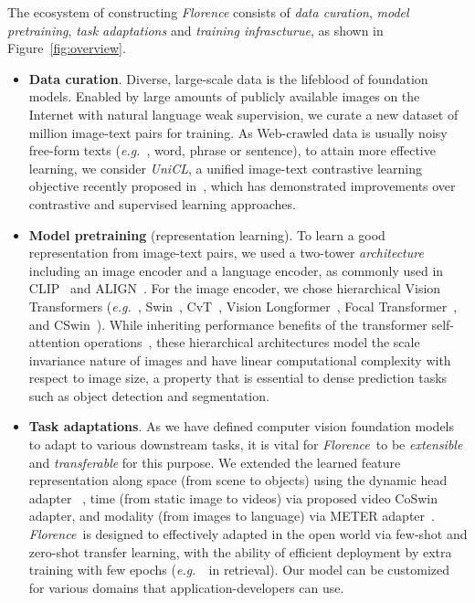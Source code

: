 \documentclass{article}
\newcommand{\eg}{{\it{e.g.}~}}
\newcommand{\Florence}{\emph{Florence~}}
\begin{document}
The ecosystem of constructing \emph{Florence} consists of \emph{data curation}, \emph{model pretraining}, \emph{task adaptations} and \emph{training infrascturue}, as shown in Figure~\ref{fig:overview}.
\begin{itemize}
    \item \textbf{Data curation}. Diverse, large-scale data is the lifeblood of foundation models. Enabled by large amounts of publicly available images on the Internet with natural language weak supervision, we curate a new dataset of  million image-text pairs for training. As Web-crawled data is usually noisy free-form texts (\eg, word, phrase or sentence), to attain more effective learning, we consider {\emph{UniCL}}, a unified image-text contrastive learning objective recently proposed in~\cite{Jianwei_UNICL2022}, which has demonstrated improvements over contrastive and supervised learning approaches.

    \item \textbf{Model pretraining} (representation learning). To learn a good representation from image-text pairs, we used a two-tower \emph{architecture} including an image encoder and a language encoder, as commonly used in CLIP~\cite{radford2021learning} and ALIGN~\cite{jia2021scaling}. For the image encoder, we chose hierarchical Vision Transformers (\eg, Swin~\cite{liu2021Swin}, CvT~\cite{Wu_2021_ICCV}, Vision Longformer~\cite{zhang2021multi}, Focal Transformer~\cite{yang2021focal}, and CSwin~\cite{dong2021cswin}). While inheriting performance benefits of the transformer self-attention operations~\cite{dosovitskiy2021image}, these hierarchical architectures model the scale invariance nature of images and have linear computational complexity with respect to image size, a property that is essential to dense prediction tasks such as object detection and segmentation.

    \item \textbf{Task adaptations}. As we have defined computer vision foundation models to adapt to various downstream tasks, it is vital for \Florence to be \emph{extensible} and \emph{transferable} for this purpose. We extended the learned feature representation along space (from scene to objects) using the dynamic head adapter ~\cite{Dai_2021_CVPR}, time (from static image to videos) via proposed video CoSwin adapter, and modality (from images to language) via METER adapter~\cite{dou2021empirical}. \Florence is designed to effectively adapted in the open world via few-shot and zero-shot transfer learning, with the ability of efficient deployment by extra training with few epochs (\eg ~in retrieval). Our model can be customized for various domains that application-developers can use.


\end{itemize}
\end{document}
